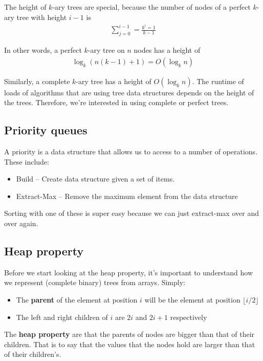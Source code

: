 \documentclass[11pt,a4paper,titlepage,dvipsnames,cmyk]{scrartcl}
\begin{document}
The height of $k$-ary trees are special, because the number of nodes of a
perfect $k$-ary tree with height $i-1$ is
\begin{align*}
    \sum_{j=0}^{i-1} = \frac{k^i = 1}{k-1}
\end{align*}

In other words, a perfect $k$-ary tree on $n$ nodes has a height of
\begin{align*}
\log_k(n(k-1) +1) = O(\log_k n)
\end{align*}

Similarly, a complete $k$-ary tree has a height of $O(\log_kn)$. The
runtime of loads of algorithms that are using tree data structures depends
on the height of the trees. Therefore, we're interested in using complete
or perfect trees.

\subsection{Priority queues}%
\label{sub:Priority queues}
A priority is a data structure that allows us to access to a number of
operations. These include:

\begin{itemize}
    \item Build -- Create data structure given a set of items.
    \item Extract-Max -- Remove the maximum element from the data
        structure
\end{itemize}

Sorting with one of these is super easy because we can just extract-max
over and over again.

\subsection{Heap property}%
\label{sub:Heap property}
Before we start looking at the heap property, it's important to understand
how we represent (complete binary) trees from arrays. Simply:
\begin{itemize}
    \item The \textbf{parent} of the element at position $i$ will be the element at position $\lfloor i/2 \rfloor$
    \item The left and right children of $i$ are $2i$ and $2i + 1$
        respectively
\end{itemize}

The \textbf{heap property} are that the parents of nodes are bigger than
that of their children. That is to say that the values that the nodes hold
are larger than that of their children's.
\end{document}

